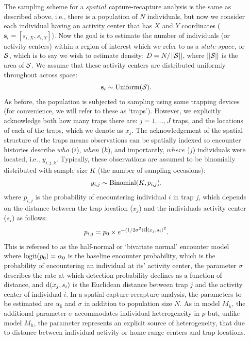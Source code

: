 \documentclass{book}
\begin{document}
The sampling scheme for a $spatial$ capture-recapture analysis is the
same as described above, i.e., there is a population of $N$
individuals, but now we consider each individual having an activity
center that has $X$ and $Y$ coordinates
($\textbf{s}_i=[s_{i,X},s_{i,Y}]$). Now the goal is to estimate the
number of individuals (or activity centers) within a region of
interest which we refer to as a $state$-$space$, or ${\cal S}$, which
is to say we wish to estimate density: $D = N/||{\cal S}||$, where
$||{\cal S}||$ is the area of ${\cal S}$. We assume that these
activity centers are distributed uniformly throughout across space:
\[
\textbf{s}_i \sim \hbox{Uniform}({\cal S}).
\]
As before, the population is subjected to sampling using some trapping
devices (for convenience, we will refer to these as `traps'). However,
we explicitly acknowledge both how many traps there are: $j=1,...,J$
traps, and the locations of each of the traps, which we denote as
$x_j$.  The acknowledgement of the spatial structure of the traps
means observations can be spatially indexed so encounter histories
describe $who$ ($i$), $when$ ($k$), and importantly, $where$ ($j$)
individuals were located, i.e., $y_{i,j,k}$. Typically, these
observations are assumed to be binomially distributed with sample size
$K$ (the number of sampling occasions):
\[
y_{i,j} \sim \hbox{Binomial}(K,p_{i,j}),
\]
where $p_{i,j}$ is the probability of encountering individual $i$ in
trap $j$, which depends on the distance between the trap location
($x_j$) and the individuals activity center ($s_i$) as follows:
\begin{equation}
p_{i,j} = p_0 \times e^{-(1/2\sigma^2) \hbox{d}(x_{j},s_{i})^{2}}.
\end{equation}
This is refereed to as the half-normal or `bivariate normal' encounter
model where $\hbox{logit}(p_0) = \alpha_0$ is the baseline encounter
probability, which is the probability of encountering an individual at
its' activity center, the parameter $\sigma$ describes the rate at
which detection probability declines as a function of distance, and
$\hbox{d}(x_{j},s_{i})$ is the Euclidean distance between trap $j$ and
the activity center of individual $i$. In a spatial capture-recapture
analysis, the parameters to be estimated are $\alpha_0$ and $\sigma$
in addition to population size $N$.  As in model $M_h$, the additional
parameter $\sigma$ accommodates individual heterogeneity in $p$ but,
unlike model $M_h$, the parameter represents an explicit source of
heterogeneity, that due to distance between individual activity or
home range centers and trap locations.
\end{document}
